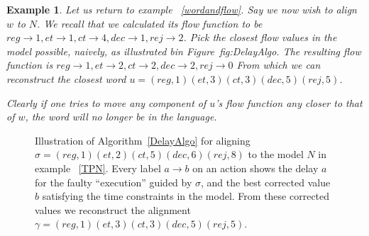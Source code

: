 \documentclass[conference]{IEEEtran}
\newtheorem{example}{Example}
\begin{document}
		
		\begin{example}
			Let us return to example ~\ref{wordandflow}. 
			Say we now wish to align  $w$ to $N$. We recall that we calculated its flow function to be $reg \to 1, et \to 1, ct \to 4, dec \to 1, rej \to 2$. 
			Pick the closest flow values in the model possible, naively, as illustrated bin Figure~{fig:DelayAlgo}.
			The resulting flow function is  $reg \to 1, et \to 2, ct \to 2, dec \to 2, rej \to 0$ From which we can reconstruct the closest word $u = (reg, 1)(et, 3)(ct, 3)(dec, 5)(rej, 5)$.
			
			Clearly if one tries to move any component of $u$'s flow function any closer to that of $w$, the word will no longer be in the language. 
			
		\end{example}
                \begin{figure}
\caption{Illustration of Algorithm~\ref{DelayAlgo} for aligning $\sigma = (reg, 1)(et, 2)(ct, 5)(dec, 6)(rej, 8)$ to the model $N$ in example ~\ref{TPN}.
  Every label $a \rightarrow b$ on an action shows the delay \(a\) for the
  faulty ``execution'' guided by \(\sigma\), and the best corrected value \(b\)
  satisfying the time constraints in the model. From these corrected values we reconstruct the
  alignment $\gamma = (reg, 1)(et, 3)(ct, 3)(dec, 5)(rej, 5)$.
}
                  \label{fig:DelayAlgo}
                \end{figure}
\end{document}
